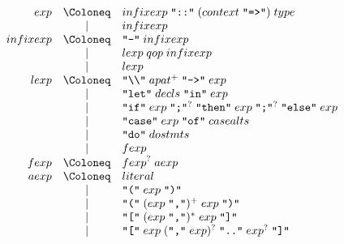 \begin{align*}
  \begin{array}{rcl}
    {exp}
    & \Coloneq & {infixexp}\; \text{\texttt{\textquotedbl ::\textquotedbl}}\; ({context}\; \text{\texttt{\textquotedbl =>\textquotedbl}})\; {type} \\
    & \mid & {infixexp} \\
    {infixexp}
    & \Coloneq & \text{\texttt{\textquotedbl -\textquotedbl}}\; {infixexp} \\
    & \mid & {lexp}\; {qop}\; {infixexp} \\
    & \mid & {lexp} \\
    {lexp}
    & \Coloneq & \text{\texttt{\textquotedbl\textbackslash\textbackslash\textquotedbl}}\; {apat}^+\; \text{\texttt{\textquotedbl ->\textquotedbl}}\; {exp} \\
    & \mid & \text{\texttt{\textquotedbl let\textquotedbl}}\; {decls}\; \text{\texttt{\textquotedbl in\textquotedbl}}\; {exp} \\
    & \mid & \text{\texttt{\textquotedbl if\textquotedbl}}\; {exp}\; \text{\texttt{\textquotedbl ;\textquotedbl}}^?\; \text{\texttt{\textquotedbl then\textquotedbl}}\; {exp}\; \text{\texttt{\textquotedbl ;\textquotedbl}}^?\; \text{\texttt{\textquotedbl else\textquotedbl}}\; {exp} \\
    & \mid & \text{\texttt{\textquotedbl case\textquotedbl}}\; {exp}\; \text{\texttt{\textquotedbl of\textquotedbl}}\; {casealts} \\
    & \mid & \text{\texttt{\textquotedbl do\textquotedbl}}\; {dostmts} \\
    & \mid & {fexp} \\
    {fexp}
    & \Coloneq & {fexp}^?\; {aexp} \\
    {aexp}
    & \Coloneq & {literal} \\
    & \mid & \text{\texttt{\textquotedbl(\textquotedbl}}\; {exp}\; \text{\texttt{\textquotedbl)\textquotedbl}} \\
    & \mid & \text{\texttt{\textquotedbl(\textquotedbl}}\; ({exp}\; \text{\texttt{\textquotedbl,\textquotedbl}})^+\; {exp}\; \text{\texttt{\textquotedbl)\textquotedbl}} \\
    & \mid & \text{\texttt{\textquotedbl[\textquotedbl}}\; ({exp}\; \text{\texttt{\textquotedbl,\textquotedbl}})^*\; {exp}\; \text{\texttt{\textquotedbl]\textquotedbl}} \\
    & \mid & \text{\texttt{\textquotedbl[\textquotedbl}}\; {exp}\; (\text{\texttt{\textquotedbl,\textquotedbl}}\; {exp})^?\; \text{\texttt{\textquotedbl..\textquotedbl}}\; {exp}^?\; \text{\texttt{\textquotedbl]\textquotedbl}} \\

\end{array}
\end{align*}
